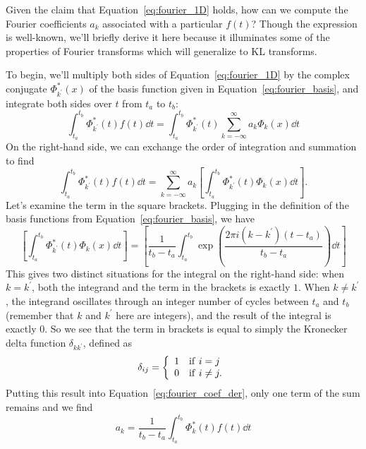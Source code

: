 Given the claim that Equation~\ref{eq:fourier_1D} holds, how can we
compute the Fourier coefficients $a_k$ associated with 
a particular $f(t)$?  Though the expression is well-known, we'll briefly
derive it here because it illuminates some of the properties of
Fourier transforms which will generalize to KL transforms.

To begin, we'll multiply both sides of Equation~\ref{eq:fourier_1D} by the
complex conjugate $\Phi^\ast_{k^\prime}(x)$ of the basis function given
in Equation~\ref{eq:fourier_basis}, and integrate both sides over $t$
from $t_a$ to $t_b$:
\begin{equation}
  \int_{t_a}^{t_b} \Phi^\ast_{k^\prime}(t) f(t) \dd t
  = \int_{t_a}^{t_b} \Phi^\ast_{k^\prime}(t) \sum_{k=-\infty}^\infty a_k\Phi_k(x)\dd t
\end{equation}
On the right-hand side, we can exchange the order of integration and
summation to find 
\begin{equation}
  \label{eq:fourier_coef_der}
  \int_{t_a}^{t_b} \Phi^\ast_{k^\prime}(t) f(t) \dd t
  =  \sum_{k=-\infty}^\infty a_k \left[\int_{t_a}^{t_b} \Phi^\ast_{k^\prime}(t)\Phi_k(x)\dd t\right].
\end{equation}
Let's examine the term in the square brackets.  Plugging in the definition
of the basis functions from Equation~\ref{eq:fourier_basis}, we have
\begin{equation}
  \left[\int_{t_a}^{t_b} \Phi^\ast_{k^\prime}(t)\Phi_k(x)\dd t\right]
  = \left[\frac{1}{t_b-t_a}\int_{t_a}^{t_b} \exp\left(\frac{2\pi i (k - k^\prime) (t-t_a)}
    {t_b - t_a}\right)\dd t\right]
\end{equation}
This gives two distinct situations for the integral on the right-hand side:
when $k=k^\prime$, both the integrand 
and the term in the brackets is exactly $1$.  When $k\ne k^\prime$,
the integrand oscillates through an integer number of cycles between
$t_a$ and $t_b$ (remember that $k$ and $k^\prime$ here are integers),
and the result of the integral is exactly $0$.
So we see that the term in brackets is equal to simply 
the Kronecker delta function $\delta_{kk^\prime}$, defined as
\begin{equation}
  \delta_{ij} = \left\{
  \begin{array}{ll}
    1 & {\rm if}\ i = j\\
    0 & {\rm if}\ i \ne j.
  \end{array}
  \right.
\end{equation}
Putting this result into Equation~\ref{eq:fourier_coef_der}, only one
term of the sum remains and we find
\begin{equation}
  \label{eq:fourier_coef}
  a_k = \frac{1}{t_b - t_a}\int_{t_a}^{t_b} \Phi^\ast_k(t) f(t) \dd t
\end{equation}

